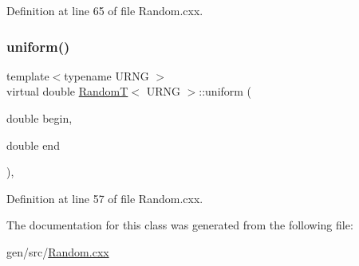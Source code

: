 Definition at line 65 of file Random.\+cxx.

\mbox{\label{class_random_t_a22dc8bd9d6e2b7db0bc5ded8fd82220d}} 
\subsubsection{\texorpdfstring{uniform()}{uniform()}}
{\footnotesize\ttfamily template$<$typename U\+R\+NG $>$ \\
virtual double \hyperlink{class_random_t}{RandomT}$<$ U\+R\+NG $>$\+::uniform (\begin{DoxyParamCaption}\item[{double}]{begin,  }\item[{double}]{end }\end{DoxyParamCaption})\hspace{0.3cm}{\ttfamily [inline]}, {\ttfamily [virtual]}}



Definition at line 57 of file Random.\+cxx.



The documentation for this class was generated from the following file\+:\begin{DoxyCompactItemize}
\item 
gen/src/\hyperlink{_random_8cxx}{Random.\+cxx}\end{DoxyCompactItemize}
